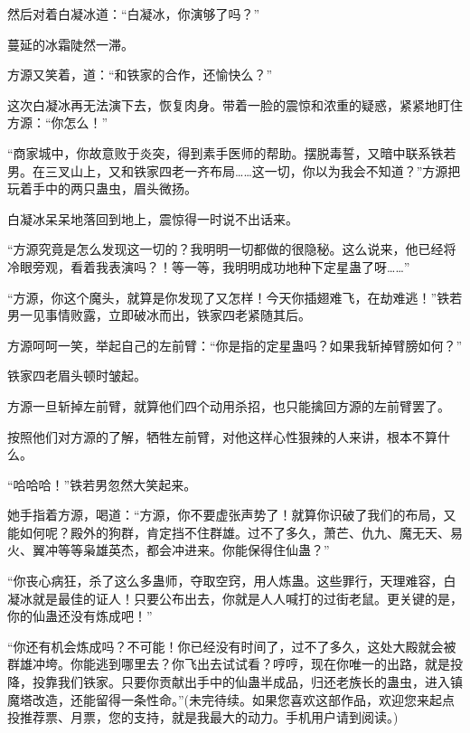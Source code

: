 \begin{this_body}
然后对着白凝冰道：“白凝冰，你演够了吗？”

蔓延的冰霜陡然一滞。

方源又笑着，道：“和铁家的合作，还愉快么？”

这次白凝冰再无法演下去，恢复肉身。带着一脸的震惊和浓重的疑惑，紧紧地盯住方源：“你怎么！”

“商家城中，你故意败于炎突，得到素手医师的帮助。摆脱毒誓，又暗中联系铁若男。在三叉山上，又和铁家四老一齐布局……这一切，你以为我会不知道？”方源把玩着手中的两只蛊虫，眉头微扬。

白凝冰呆呆地落回到地上，震惊得一时说不出话来。

“方源究竟是怎么发现这一切的？我明明一切都做的很隐秘。这么说来，他已经将冷眼旁观，看着我表演吗？！等一等，我明明成功地种下定星蛊了呀……”

“方源，你这个魔头，就算是你发现了又怎样！今天你插翅难飞，在劫难逃！”铁若男一见事情败露，立即破冰而出，铁家四老紧随其后。

方源呵呵一笑，举起自己的左前臂：“你是指的定星蛊吗？如果我斩掉臂膀如何？”

铁家四老眉头顿时皱起。

方源一旦斩掉左前臂，就算他们四个动用杀招，也只能擒回方源的左前臂罢了。

按照他们对方源的了解，牺牲左前臂，对他这样心性狠辣的人来讲，根本不算什么。

“哈哈哈！”铁若男忽然大笑起来。

她手指着方源，喝道：“方源，你不要虚张声势了！就算你识破了我们的布局，又能如何呢？殿外的狗群，肯定挡不住群雄。过不了多久，萧芒、仇九、魔无天、易火、翼冲等等枭雄英杰，都会冲进来。你能保得住仙蛊？”

“你丧心病狂，杀了这么多蛊师，夺取空窍，用人炼蛊。这些罪行，天理难容，白凝冰就是最佳的证人！只要公布出去，你就是人人喊打的过街老鼠。更关键的是，你的仙蛊还没有炼成吧！”

“你还有机会炼成吗？不可能！你已经没有时间了，过不了多久，这处大殿就会被群雄冲垮。你能逃到哪里去？你飞出去试试看？哼哼，现在你唯一的出路，就是投降，投靠我们铁家。只要你贡献出手中的仙蛊半成品，归还老族长的蛊虫，进入镇魔塔改造，还能留得一条性命。”(未完待续。如果您喜欢这部作品，欢迎您来起点投推荐票、月票，您的支持，就是我最大的动力。手机用户请到阅读。)

\end{this_body}


